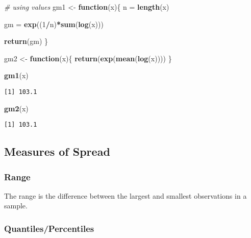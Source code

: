 \documentclass[12pt,]{article}
\newenvironment{Shaded}{\begin{snugshade}}{\end{snugshade}}
\newcommand{\KeywordTok}[1]{\textcolor[rgb]{0.13,0.29,0.53}{\textbf{#1}}}
\newcommand{\DecValTok}[1]{\textcolor[rgb]{0.00,0.00,0.81}{#1}}
\newcommand{\StringTok}[1]{\textcolor[rgb]{0.31,0.60,0.02}{#1}}
\newcommand{\CommentTok}[1]{\textcolor[rgb]{0.56,0.35,0.01}{\textit{#1}}}
\newcommand{\ControlFlowTok}[1]{\textcolor[rgb]{0.13,0.29,0.53}{\textbf{#1}}}
\newcommand{\OperatorTok}[1]{\textcolor[rgb]{0.81,0.36,0.00}{\textbf{#1}}}
\newcommand{\NormalTok}[1]{#1}
\theoremstyle{definition}
\theoremstyle{definition}
\theoremstyle{definition}
\theoremstyle{remark}
\begin{document}
\begin{Shaded}
\begin{Highlighting}[]
\CommentTok{# using values }
\NormalTok{gm1 <-}\StringTok{ }\ControlFlowTok{function}\NormalTok{(x)\{}
\NormalTok{  n =}\StringTok{ }\KeywordTok{length}\NormalTok{(x)}
  
\NormalTok{  gm =}\StringTok{ }\KeywordTok{exp}\NormalTok{((}\DecValTok{1}\OperatorTok{/}\NormalTok{n)}\OperatorTok{*}\KeywordTok{sum}\NormalTok{(}\KeywordTok{log}\NormalTok{(x)))}

  \KeywordTok{return}\NormalTok{(gm)}
\NormalTok{\}}

\NormalTok{gm2 <-}\StringTok{ }\ControlFlowTok{function}\NormalTok{(x)\{}
  \KeywordTok{return}\NormalTok{(}\KeywordTok{exp}\NormalTok{(}\KeywordTok{mean}\NormalTok{(}\KeywordTok{log}\NormalTok{(x))))}
\NormalTok{\}}
\end{Highlighting}
\end{Shaded}

\begin{Shaded}
\begin{Highlighting}[]
\KeywordTok{gm1}\NormalTok{(x)}
\end{Highlighting}
\end{Shaded}

\begin{verbatim}
[1] 103.1
\end{verbatim}

\begin{Shaded}
\begin{Highlighting}[]
\KeywordTok{gm2}\NormalTok{(x)}
\end{Highlighting}
\end{Shaded}

\begin{verbatim}
[1] 103.1
\end{verbatim}

\subsection{Measures of Spread}\label{measures-of-spread}

\subsubsection{Range}\label{range}

The range is the difference between the largest and smallest
observations in a sample.

\subsubsection{Quantiles/Percentiles}\label{quantilespercentiles}
\end{document}
